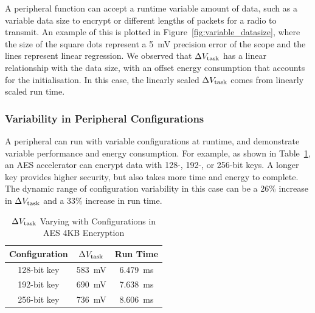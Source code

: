 A peripheral function can accept a runtime variable amount of data, such as a variable data size to encrypt or different lengths of packets for a radio to transmit. 
An example of this is plotted in Figure~\ref{fig:variable_datasize}, where the size of the square dots represent a \SI{5}{\milli\volt} precision error of the scope and the lines represent linear regression. 
We observed that $\Delta V_{\text{task}}$ has a linear relationship with the data size, with an offset energy consumption that accounts for the initialisation. 
In this case, the linearly scaled $\Delta V_{\text{task}}$ comes from linearly scaled run time. 



\subsubsection{Variability in Peripheral Configurations}

A peripheral can run with variable configurations at runtime, and demonstrate variable performance and energy consumption. 
For example, as shown in Table~\ref{tab:configurations}, an AES accelerator can encrypt data with 128-, 192-, or 256-bit keys. 
A longer key provides higher security, but also takes more time and energy to complete.
The dynamic range of configuration variability in this case can be a 26\% increase in $\Delta V_{\text{task}}$ and a 33\% increase in run time.

\begin{table}
    \renewcommand{\arraystretch}{1.2}
    \centering
    \caption{$\Delta V_{\text{task}}$ Varying with Configurations in AES 4KB Encryption}
    \label{tab:configurations}
    \begin{tabular}{|c|c|c|}
    \hline
    \textbf{Configuration} & \textbf{$\Delta V_{\text{task}}$} & \textbf{Run Time} \\
    \hline
    128-bit key & \SI{583}{\milli\volt} & \SI{6.479}{\milli\second} \\
    192-bit key & \SI{690}{\milli\volt} & \SI{7.638}{\milli\second} \\
    256-bit key & \SI{736}{\milli\volt} & \SI{8.606}{\milli\second} \\
    \hline
    \end{tabular}
\end{table}

